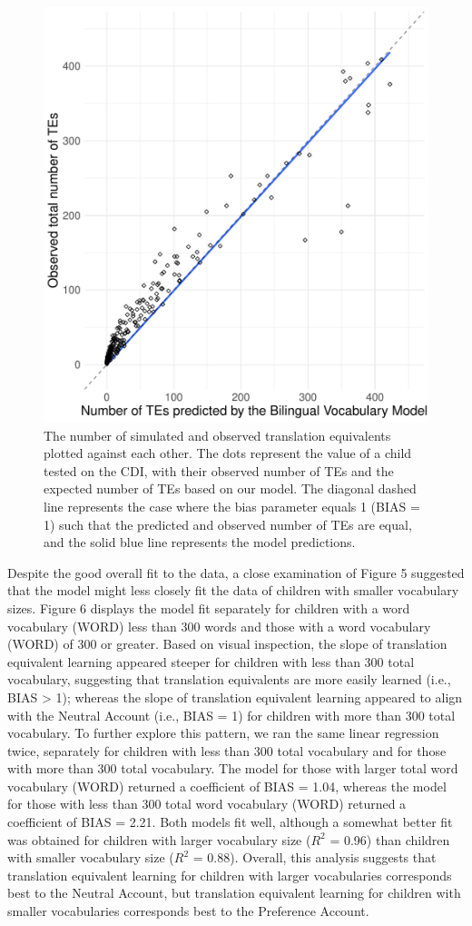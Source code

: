 \documentclass[
  english,
  ,man,floatsintext]{apa6}
\begin{document}
\begin{figure}

{\centering \includegraphics[width=0.6\linewidth,height=0.6\textheight]{paper_TE_bilingual_vocabulary_model_files/figure-latex/fig5-1} 

}

\caption{The number of simulated and observed translation equivalents plotted against each other. The dots represent the value of a child tested on the CDI, with their observed number of TEs and the expected number of TEs based on our model. The diagonal dashed line represents the case where the bias parameter equals 1 (BIAS = 1) such that the predicted and observed number of TEs are equal, and the solid blue line represents the model predictions.}\label{fig:fig5}
\end{figure}

Despite the good overall fit to the data, a close examination of Figure 5 suggested that the model might less closely fit the data of children with smaller vocabulary sizes. Figure 6 displays the model fit separately for children with a word vocabulary (WORD) less than 300 words and those with a word vocabulary (WORD) of 300 or greater. Based on visual inspection, the slope of translation equivalent learning appeared steeper for children with less than 300 total vocabulary, suggesting that translation equivalents are more easily learned (i.e., BIAS \textgreater{} 1); whereas the slope of translation equivalent learning appeared to align with the Neutral Account (i.e., BIAS = 1) for children with more than 300 total vocabulary. To further explore this pattern, we ran the same linear regression twice, separately for children with less than 300 total vocabulary and for those with more than 300 total vocabulary. The model for those with larger total word vocabulary (WORD) returned a coefficient of BIAS = 1.04, whereas the model for those with less than 300 total word vocabulary (WORD) returned a coefficient of BIAS = 2.21. Both models fit well, although a somewhat better fit was obtained for children with larger vocabulary size (\(R^2\) = 0.96) than children with smaller vocabulary size (\(R^2\) = 0.88). Overall, this analysis suggests that translation equivalent learning for children with larger vocabularies corresponds best to the Neutral Account, but translation equivalent learning for children with smaller vocabularies corresponds best to the Preference Account.
\end{document}
